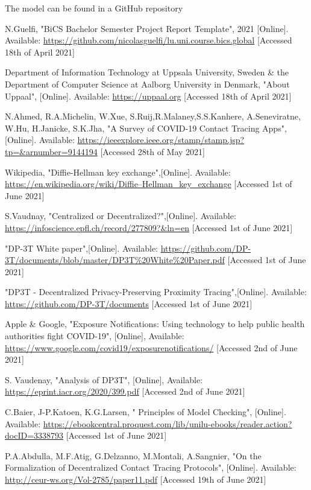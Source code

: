 \documentclass[a4paper, twocolumn]{article}
\begin{document}
\noindent The model can be found in a GitHub repository \cite{github}

\begin{thebibliography}{9}
N.Guelfi, "BiCS Bachelor Semester Project Report Template", 2021 [Online]. Available: \url{ https://github.com/nicolasguelfi/lu.uni.course.bics.global} 
[Accessed 18th of April 2021]

Department of Information Technology at Uppsala University, Sweden \& the Department of Computer Science at Aalborg University in Denmark, "About Uppaal", [Online]. Available: \url{https://uppaal.org} [Accessed 18th of April 2021]

N.Ahmed, R.A.Michelin, W.Xue, S.Ruij,R.Malaney,S.S.Kanhere, A.Seneviratne, W.Hu, H.Janicke, S.K.Jha, "A Survey of COVID-19 Contact Tracing Apps", [Online]. Available: \url{https://ieeexplore.ieee.org/stamp/stamp.jsp?tp=&arnumber=9144194} [Accessed 28th of May 2021]

Wikipedia, "Diffie-Hellman key exchange",[Online]. Available: \url{https://en.wikipedia.org/wiki/Diffie–Hellman_key_exchange} [Accessed 1st of June 2021]

S.Vaudnay, "Centralized or Decentralized?",[Online]. Available: \url{https://infoscience.epfl.ch/record/277809?&ln=en} [Accessed 1st of June 2021]

"DP-3T White paper",[Online]. Available: \url{https://github.com/DP-3T/documents/blob/master/DP3T\%20White\%20Paper.pdf} [Accessed 1st of June 2021]

"DP3T - Decentralized Privacy-Preserving Proximity Tracing",[Online]. Available: \url{https://github.com/DP-3T/documents} [Accessed 1st of June 2021]

Apple \& Google, "Exposure Notifications: Using technology to help public health authorities fight COVID-19", [Online], Available: \url{https://www.google.com/covid19/exposurenotifications/} [Accessed 2nd of June 2021]

S. Vaudenay, "Analysis of DP3T", [Online], Available: \url{https://eprint.iacr.org/2020/399.pdf} [Accessed 2nd of June 2021]

C.Baier, J-P.Katoen, K.G.Larsen, " Principles of Model Checking", [Online]. Available: \url{https://ebookcentral.proquest.com/lib/unilu-ebooks/reader.action?docID=3338793} [Accessed 1st of June 2021]

P.A.Abdulla, M.F.Atig, G.Delzanno, M.Montali, A.Sangnier, "On the Formalization of Decentralized Contact Tracing Protocols", [Online]. Available: \url{http://ceur-ws.org/Vol-2785/paper11.pdf} [Accessed 19th of June 2021]


\end{thebibliography}
\end{document}
